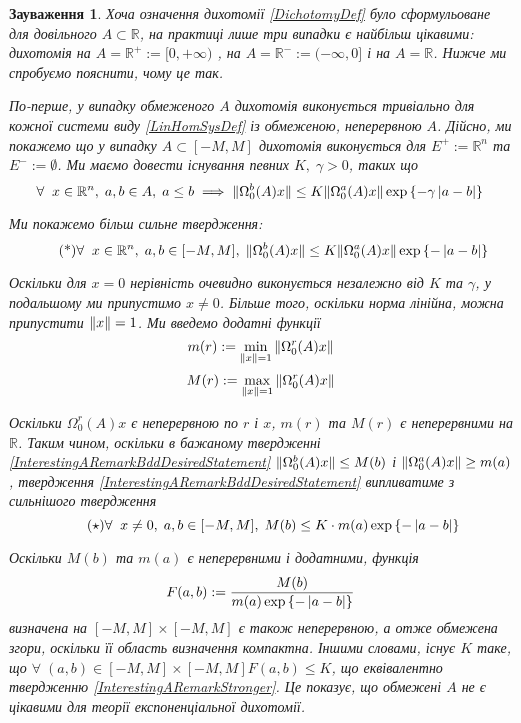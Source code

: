 \documentclass[14pt]{extarticle} %
\let\oldforall\forall
\renewcommand{\forall}{\oldforall\;}
\newtheorem{remark}{Зауваження}
\begin{document}
\begin{remark}
	Хоча означення дихотомії \ref{DichotomyDef} було сформульоване для довільного $A\subset\mathbb{R}$, на практиці лише три випадки є 
	найбільш цікавими: дихотомія на $A=\mathbb{R}^+:=[0,+\infty)$
	, на $A=\mathbb{R}^-:=(-\infty,0]$ і на $A=\mathbb{R}$. Нижче ми спробуємо пояснити, чому це так.

	По-перше, у випадку обмеженого $A$ дихотомія виконується тривіально для кожної системи виду \ref{LinHomSysDef} із обмеженою, неперервною
	$A$. Дійсно, ми покажемо що у випадку $A\subset[-M,M]$ дихотомія виконується для $E^+:=\mathbb{R}^n$ та $E^-:=\emptyset$. Ми маємо
	довести існування певних $K,\;\gamma>0$, таких що
	\[\forall x\in\mathbb{R}^n,\;a,b\in A,\;a\leq b\implies 
	\mynorm{\Omega^b_0(A){x}}\leq K\mynorm{\Omega_0^a(A){x}}\exp\left\{-\gamma\myabs{a-b}\right\}\\
	\]

	Ми покажемо більш сильне твердження:
	\[\tag{*}\label{InterestingARemarkBddDesiredStatement}
	\forall x\in\mathbb{R}^n,\;a,b\in [-M,M],\;
	\mynorm{\Omega^b_0(A){x}}\leq K\mynorm{\Omega_0^a(A){x}}\exp\left\{-\myabs{a-b}\right\}\\
	\]
	
	Оскільки для $x=0$ нерівність очевидно виконується незалежно від $K$ та $\gamma$, у подальшому ми припустимо $x\neq 0$. Більше того,
	оскільки норма лінійна, можна припустити $\|x\|=1$. Ми введемо додатні функції
	\[m(r):=\min_{\mynorm{x}=1}\mynorm{\Omega^r_0(A)x}\]
	\[M(r):=\max_{\mynorm{x}=1}\mynorm{\Omega^r_0(A)x}\]
	
	Оскільки $\Omega_0^r(A)x$ є неперервною по $r$ і $x$, $m(r)$ та $M(r)$ є неперервними на $\mathbb{R}$. Таким чином, оскільки в 
	бажаному твердженні \ref{InterestingARemarkBddDesiredStatement} $\|\Omega^b_0(A)x\|\leq M(b)$ і $\|\Omega^a_0(A)x\|
	\geq m(a)$, твердження \ref{InterestingARemarkBddDesiredStatement} випливатиме з сильнішого твердження
	\[\tag{$\star$}\label{InterestingARemarkStronger}
	\forall x\neq 0,\;a,b\in [-M,M],\;
	M(b)\leq K\cdot m(a)\exp\left\{-\myabs{a-b}\right\}\\
	\]

	Оскільки $M(b)$ та $m(a)$ є неперервними і додатними, функція 
	\[F(a,b):=\frac{M(b)}{m(a)\exp\left\{-\left|a-b\right|\right\}}\]
	визначена на $[-M,M]\times[-M,M]$ є також неперервною, а отже обмежена згори, оскільки її область визначення компактна. Іншими словами,
	існує $K$ таке, що $\forall (a,b)\in[-M,M]\times[-M,M] F(a,b)\leq K$, що еквівалентно твердженню
	\ref{InterestingARemarkStronger}. Це показує, що обмежені $A$ не є цікавими для теорії експоненціальної дихотомії.


\end{remark}
\end{document}
